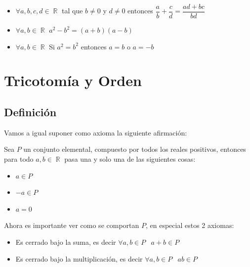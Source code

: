 \documentclass[12pt, fleqn]{report}                             %
\newenvironment{SmallIndentation}[1][0.75em]                    %
        {\begin{adjustwidth}{#1}{}\begin{footnotesize}}             %
        {\end{footnotesize}\end{adjustwidth}}                       %
\DeclareMathOperator \Space     {\quad}                         %
\DeclareMathOperator \MiniSpace {\;}                            %
\theoremstyle{break}                                            %
\DeclareMathOperator \Reals        {\mathbb{R}}                 %
\begin{document}
\begin{itemize}
\begin{SmallIndentation}[1em]
                        
                        \end{SmallIndentation}
                    
                    \item $\forall a, b, c, d \in \Reals$ tal que $b \neq 0$ y $d \neq 0$ entonces
                        $\dfrac{a}{b} + \dfrac{c}{d} = \dfrac{ad+bc}{bd}$        

                    \item $\forall a, b \in \Reals$ $a^2-b^2 = (a+b)(a-b)$

                    \item $\forall a, b \in \Reals$ Si $a^2 = b^2$ entonces $a=b$ o $a=-b$

                \end{itemize}


        \clearpage
        \section{Tricotomía y Orden}

            \subsection{Definición}

                Vamos a igual suponer como axioma la siguiente afirmación:

                Sea $P$ un conjunto elemental, compuesto por todos los reales positivos, entonces 
                para todo $a, b \in \Reals$ pasa una y solo una de las siguientes cosas:

                \begin{itemize}
                    \item $a \in P$
                    \item $-a \in P$
                    \item $a = 0$
                \end{itemize}

                Ahora es importante ver como se comportan $P$, en especial estos 2 axiomas:
                \begin{itemize}
                    \item Es cerrado bajo la suma, es decir $\forall a, b \in P \MiniSpace a + b \in P$
                    \item Es cerrado bajo la multiplicación, es decir $\forall a, b \in P \MiniSpace ab \in P$
                \end{itemize}
\end{document}
